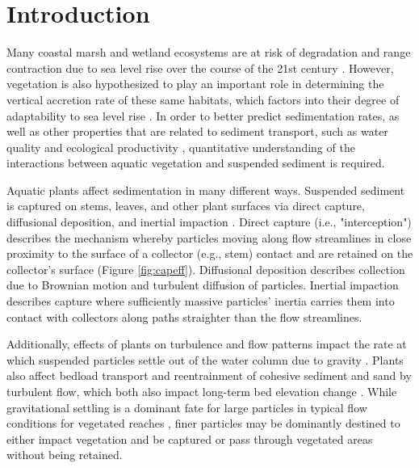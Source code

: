 \documentclass[geosciences,article,submit,moreauthors,pdftex]{Definitions/mdpi}
\begin{document}
\section{Introduction}

Many coastal marsh and wetland ecosystems are at risk of degradation and range contraction due to sea level rise over the course of the 21st century \cite{thorne2018us,jankowski2017vulnerability}. However, vegetation is also hypothesized to play an important role in determining the vertical accretion rate of these same habitats, which factors into their degree of adaptability to sea level rise \cite{kirwan2010limits}. In order to better predict sedimentation rates, as well as other properties that are related to sediment transport, such as water quality \cite{goodwin2003temporal} and ecological productivity \cite{kirwan2007coupled}, quantitative understanding of the interactions between aquatic vegetation and suspended sediment is required.

Aquatic plants affect sedimentation in many different ways. Suspended sediment is captured on stems, leaves, and other plant surfaces \cite{stumpf1983process,leonard1995flow,mudd2010does} via direct capture, diffusional deposition, and inertial impaction \cite{Fauria_2015, spielman1977particle,rubenstein1977mechanisms}. Direct capture (i.e., "interception") describes the mechanism whereby particles moving along flow streamlines in close proximity to the surface of a collector (e.g., stem) contact and are retained on the collector's surface (Figure \ref{fig:capeff}). Diffusional deposition describes collection due to Brownian motion and turbulent diffusion of particles. Inertial impaction describes capture where sufficiently massive particles' inertia carries them into contact with collectors along paths straighter than the flow streamlines.

Additionally, effects of plants on turbulence and flow patterns impact the rate at which suspended particles settle out of the water column due to gravity \cite{christiansen2000flow, leonard1995flow, Nielsen_1993, Jacobs_2016, Wang_2018, mudd2010does}. Plants also affect bedload transport \cite{yager2013influence, yang2019impact, jordanova2003experimental} and reentrainment of cohesive sediment \cite{d2007landscape} and sand \cite{tinoco2018turbulence} by turbulent flow, which both also impact long-term bed elevation change \cite{wu2005depth,d2007landscape}. While gravitational settling is a dominant fate for large particles in typical flow conditions for vegetated reaches \cite{mudd2010does, leonard1995flow}, finer particles may be dominantly destined to either impact vegetation and be captured or pass through vegetated areas without being retained.
\end{document}
